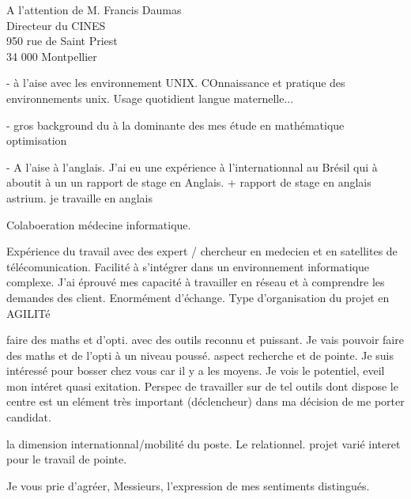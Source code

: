 \documentclass[12pt]{lettre}
\begin{document}
\begin{letter}{A l'attention de M. Francis Daumas\\Directeur du CINES\\950 rue de Saint Priest\\34 000 Montpellier}
{ - à l'aise avec les environnement UNIX. COnnaissance et pratique des environnements unix. Usage quotidient langue maternelle...

- gros background du à la dominante des mes étude en mathématique optimisation

 - A l'aise à l'anglais. J'ai eu une expérience à l'internationnal au Brésil qui à aboutit à un un rapport de stage en Anglais. + rapport de stage en anglais astrium. je travaille en anglais

 Colaboeration médecine informatique.

 Expérience du travail avec des expert / chercheur en medecien et en satellites de télécomunication. Facilité à s'intégrer dans un environnement informatique complexe. J'ai éprouvé mes capacité à travailler en réseau et à comprendre les demandes des client. Enormément d'échange. Type d'organisation du projet en AGILITé
}

{
 faire des maths et d'opti. avec des outils reconnu et puissant. Je vais pouvoir faire des maths et de l'opti à un niveau poussé. aspect recherche et de pointe. Je suis intéressé pour bosser chez vous car il y a les moyens. Je vois le potentiel, eveil mon intéret quasi exitation. Perspec de travailler sur de tel outils dont dispose le centre est un elément très important (déclencheur) dans ma décision de me porter candidat.

 la dimension internationnal/mobilité du poste. Le relationnel. projet varié
 interet pour le travail de pointe.
}


\closing{Je vous prie d'agréer, Messieurs, l'expression de mes sentiments distingués.}
\end{letter}
\end{document}

